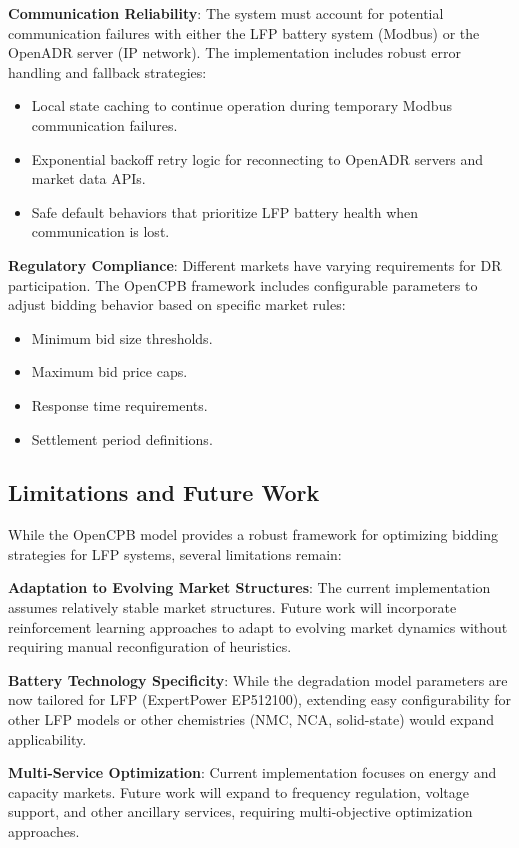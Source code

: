 \documentclass[11pt,a4paper]{article}
\begin{document}
\textbf{Communication Reliability}: The system must account for potential communication failures with either the LFP battery system (Modbus) or the OpenADR server (IP network). The implementation includes robust error handling and fallback strategies:
\begin{itemize}
    \item Local state caching to continue operation during temporary Modbus communication failures.
    \item Exponential backoff retry logic for reconnecting to OpenADR servers and market data APIs.
    \item Safe default behaviors that prioritize LFP battery health when communication is lost.
\end{itemize}

\textbf{Regulatory Compliance}: Different markets have varying requirements for DR participation. The OpenCPB framework includes configurable parameters to adjust bidding behavior based on specific market rules:
\begin{itemize}
    \item Minimum bid size thresholds.
    \item Maximum bid price caps.
    \item Response time requirements.
    \item Settlement period definitions.
\end{itemize}

\subsection{Limitations and Future Work}
While the OpenCPB model provides a robust framework for optimizing bidding strategies for LFP systems, several limitations remain:

\textbf{Adaptation to Evolving Market Structures}: The current implementation assumes relatively stable market structures. Future work will incorporate reinforcement learning approaches to adapt to evolving market dynamics without requiring manual reconfiguration of heuristics.

\textbf{Battery Technology Specificity}: While the degradation model parameters are now tailored for LFP (ExpertPower EP512100), extending easy configurability for other LFP models or other chemistries (NMC, NCA, solid-state) would expand applicability.

\textbf{Multi-Service Optimization}: Current implementation focuses on energy and capacity markets. Future work will expand to frequency regulation, voltage support, and other ancillary services, requiring multi-objective optimization approaches.
\end{document}
